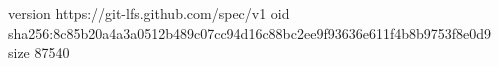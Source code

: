 version https://git-lfs.github.com/spec/v1
oid sha256:8c85b20a4a3a0512b489c07cc94d16c88bc2ee9f93636e611f4b8b9753f8e0d9
size 87540
